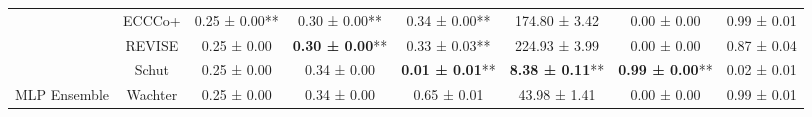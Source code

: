 \begin{table}
{\begin{tabular}[t]{cccccccc}
 & ECCCo+ & 0.25 ± 0.00** & 0.30 ± 0.00** & 0.34 ± 0.00** & 174.80 ± 3.42\hphantom{*}\hphantom{*} & 0.00 ± 0.00\hphantom{*}\hphantom{*} & 0.99 ± 0.01\hphantom{*}\hphantom{*}\\

 & REVISE & 0.25 ± 0.00\hphantom{*}\hphantom{*} & \textbf{0.30 ± 0.00}** & 0.33 ± 0.03** & 224.93 ± 3.99\hphantom{*}\hphantom{*} & 0.00 ± 0.00\hphantom{*}\hphantom{*} & 0.87 ± 0.04\hphantom{*}\hphantom{*}\\

 & Schut & 0.25 ± 0.00\hphantom{*}\hphantom{*} & 0.34 ± 0.00\hphantom{*}\hphantom{*} & \textbf{0.01 ± 0.01}** & \textbf{8.38 ± 0.11}** & \textbf{0.99 ± 0.00}** & 0.02 ± 0.01\hphantom{*}\hphantom{*}\\

\multirow[t]{-6}{*}{\centering\arraybackslash MLP Ensemble} & Wachter & 0.25 ± 0.00\hphantom{*}\hphantom{*} & 0.34 ± 0.00\hphantom{*}\hphantom{*} & 0.65 ± 0.01\hphantom{*}\hphantom{*} & 43.98 ± 1.41\hphantom{*}\hphantom{*} & 0.00 ± 0.00\hphantom{*}\hphantom{*} & 0.99 ± 0.01\hphantom{*}\hphantom{*}\\
\bottomrule
\end{tabular}}
\end{table}
